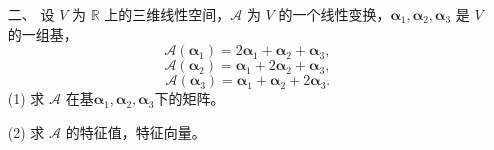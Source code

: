 \begin{enumerate}[1~]
\item[二、]
 设 $V$ 为 $\mathbb{R}$ 上的三维线性空间，$\mathscr{A}$ 为 $V$ 的一个线性变换，$\boldsymbol{\alpha}_1, \boldsymbol{\alpha}_2, \boldsymbol{\alpha}_3$ 是 $V$ 的一组基，
 $$\mathscr { A } \left( \boldsymbol{\alpha} _ { 1 } \right) = 2 \boldsymbol{\alpha} _ { 1 } + \boldsymbol{\alpha} _ { 2 } + \boldsymbol{\alpha} _ { 3 },$$
$$\mathscr { A } \left( \boldsymbol{\alpha} _ { 2 } \right) = \boldsymbol{\alpha} _ { 1 } + 2 \boldsymbol{\alpha} _ { 2 } + \boldsymbol{\alpha} _ { 3 },$$
$$\mathscr { A } \left( \boldsymbol{\alpha} _ { 3 } \right) = \boldsymbol{\alpha} _ { 1 } + \boldsymbol{\alpha} _ { 2 } + 2 \boldsymbol{\alpha} _ { 3 }.$$
(1) 求 $\mathscr{A}$ 在基$\boldsymbol{\alpha} _ { 1 } , \boldsymbol{\alpha} _ { 2 } , \boldsymbol{\alpha} _ { 3 }$下的矩阵。

(2) 求 $\mathscr{A}$ 的特征值，特征向量。


\end{enumerate}
